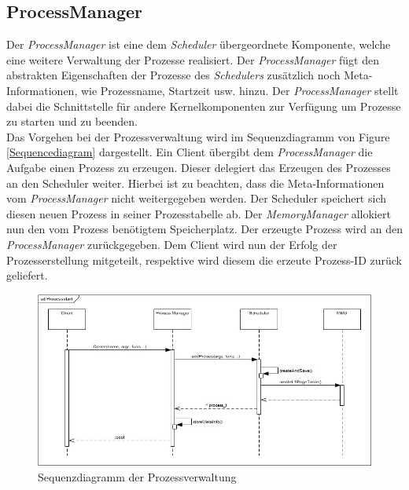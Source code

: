 \subsection{ProcessManager}

Der \textit{ProcessManager} ist eine dem \textit{Scheduler} übergeordnete Komponente, welche eine weitere Verwaltung der Prozesse realisiert. Der \textit{ProcessManager} fügt den abstrakten Eigenschaften der Prozesse des \textit{Schedulers} zusätzlich noch Meta-Informationen, wie Prozessname, Startzeit usw. hinzu. Der \textit{ProcessManager} stellt dabei die Schnittstelle für andere Kernelkomponenten zur Verfügung um Prozesse zu starten und zu beenden.\\

Das Vorgehen bei der Prozessverwaltung wird im Sequenzdiagramm von Figure \ref{Sequencediagram} dargestellt. Ein Client übergibt dem \textit{ProcessManager} die Aufgabe einen Prozess zu erzeugen. Dieser delegiert das Erzeugen des Prozesses an den Scheduler weiter. Hierbei ist zu beachten, dass die Meta-Informationen vom \textit{ProcessManager} nicht weitergegeben werden. Der Scheduler speichert sich diesen neuen Prozess in seiner Prozesstabelle ab. Der \textit{MemoryManager} allokiert nun den vom Prozess benötigtem Speicherplatz. Der erzeugte Prozess wird an den \textit{ProcessManager} zurückgegeben. Dem Client wird nun der Erfolg der Prozesserstellung mitgeteilt, respektive wird diesem die erzeute Prozess-ID zurück geliefert.

\begin{figure}[H]
	\includegraphics[scale=0.70]{chapters/processmanagement/figures/processmanagement-sequence-diagram}
	\caption{Sequenzdiagramm der Prozessverwaltung}
	\label{fig:Sequencediagram}
\end{figure}

\pagebreak 